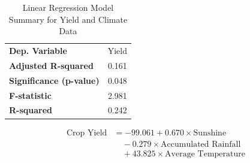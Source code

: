 \begin{table}[h]
    \centering
    \caption{Linear Regression Model Summary for Yield and Climate Data}
    \begin{tabular}{lc}
        \toprule
        \textbf{Dep. Variable} & Yield \\
        \textbf{Adjusted R-squared} & 0.161 \\
        \textbf{Significance (p-value)} & 0.048 \\
        \textbf{F-statistic} & 2.981 \\
        \textbf{R-squared} & 0.242 \\
        \bottomrule
    \end{tabular}
\end{table}

\begin{table}[h]
    \centering
    \caption{Regression Coefficients for Yield and Climate Data}
    \label{reg_coef_climate_yield}
\end{table}

\begin{equation}
    \begin{split}
        \text{Crop Yield} &= -99.061 + 0.670 \times \text{Sunshine} \\
        &\quad - 0.279 \times \text{Accumulated Rainfall} \\
        &\quad + 43.825 \times \text{Average Temperature}
    \end{split}
\end{equation}



